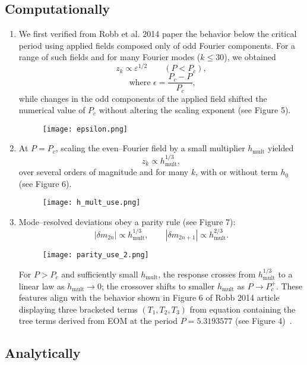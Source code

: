 \documentclass{article}
\begin{document}
\subsection{Computationally}
\begin{enumerate}
    \item 
We first verified from Robb et al. 2014 paper the behavior below the critical period using applied fields composed only of odd Fourier components. For a range of such fields and for many Fourier modes ($k\le 30$), we obtained
\[
z_k \propto \varepsilon^{1/2}\qquad(P<P_c),
\]
\[\text{ where } \epsilon = \frac{P_c-P}{P_c},\]
while changes in the odd components of the applied field shifted the numerical value of $P_c$ without altering the scaling exponent (see Figure 5). 
\begin{figure}[h]
    \centering
    \texttt{[image: epsilon.png]}
    \caption{}
    \label{sklabel}
\end{figure}
\item
At $P=P_c$, scaling the even–Fourier field by a small multiplier $h_{\mathrm{mult}}$ yielded
\[
z_k \propto h_{\mathrm{mult}}^{1/3},
\]
over several orders of magnitude and for many $k$, with or without term $h_0$ (see Figure 6).
\begin{figure}[h]
    \centering
    \texttt{[image: h\_mult\_use.png]}
    \caption{}
    \label{sklabel}
\end{figure}

\item
Mode–resolved deviations obey a parity rule (see Figure 7):
\[
|\delta m_{2n}| \propto h_{\mathrm{mult}}^{1/3},\qquad |\delta m_{2n+1}| \propto h_{\mathrm{mult}}^{2/3}.
\]
\begin{figure}[h]
    \centering
    \texttt{[image: parity\_use\_2.png]}
    \caption{}
    \label{sklabel}
\end{figure}

For $P>P_c$ and sufficiently small $h_{\mathrm{mult}}$, the response crosses from $h_{\mathrm{mult}}^{1/3}$ to a linear law as $h_{\mathrm{mult}}\to 0$; the crossover shifts to smaller $h_{\mathrm{mult}}$ as $P\to P_c^+$. 
These features align with the behavior shown in Figure 6 of Robb 2014 article displaying three bracketed terms $(T_1, T_2, T_3)$ from equation containing the tree terms derived from EOM at the period $P = 5.3193577$ (see Figure 4)~\cite{2014}.

\end{enumerate}
\subsection{Analytically}
\end{document}
